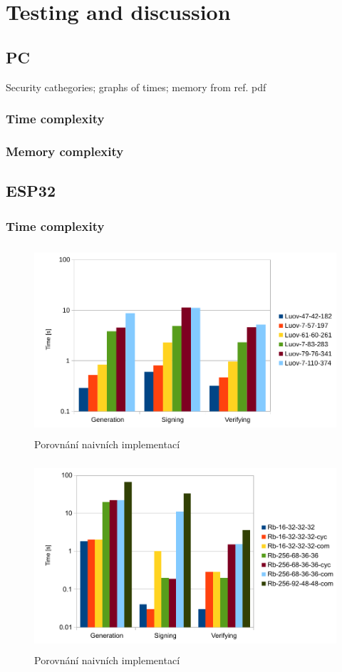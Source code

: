 \documentclass[thesis=M,english]{FITthesis}[2019/12/23]
\begin{document}
\chapter{Testing and discussion} \label{test-and-disk}
\section{PC}
Security cathegories; graphs of times; memory from ref. pdf
\subsection{Time complexity}

\subsection{Memory complexity}

\section{ESP32}
\subsection{Time complexity}
\begin{figure}[H]
\centering
\includegraphics[width=13cm,height=7cm]{images/time-luov.pdf}
\caption{Porovnání naivních implementací}
\label{time-luov}
\end{figure}

\begin{figure}[H]
\centering
\includegraphics[width=13cm,height=7cm]{images/time-rb.pdf}
\caption{Porovnání naivních implementací}
\label{time-rb}
\end{figure}
\end{document}
